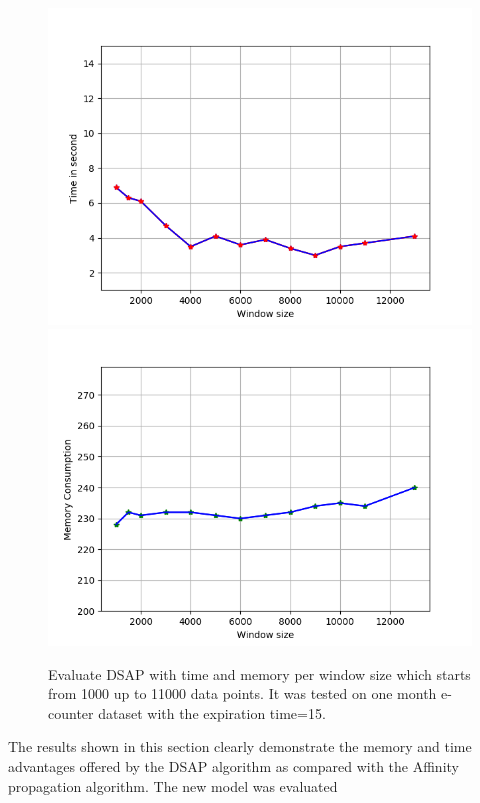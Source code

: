 \begin{figure}[!h]
    \centering
    \includegraphics[width = 7.5 cm]{image/Chapters/Chapter6/time.point.lessinitial.png}\hfill
    \includegraphics[width = 7.5 cm]{image/Chapters/Chapter6/mem.point.lessinitial.png}
    \\[\smallskipamount]    
    \caption{ Evaluate DSAP with time and memory per window size which starts from 1000 up to 11000 data points. It was tested on one month e-counter dataset with the expiration time=15.}
    \label{timecomplex}
\end{figure}

The results shown in this section clearly demonstrate the memory and time advantages offered by the DSAP algorithm as compared with the Affinity propagation algorithm. The new model was evaluated  







